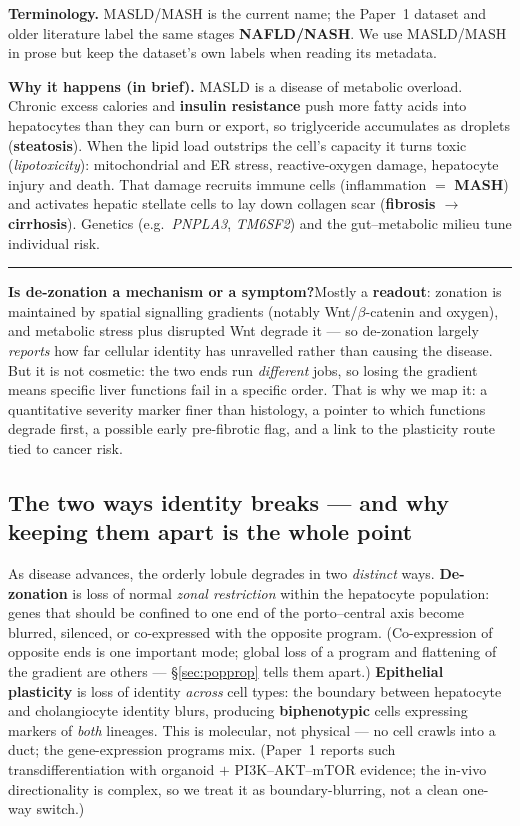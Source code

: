 \documentclass[11pt]{article}
\newcommand{\aside}[2]{\par\medskip\noindent\textcolor{teal0}{\rule{2pt}{\baselineskip}}\quad\textbf{\textcolor{teal0}{#1}}\quad #2\par\medskip}
\newcommand{\gene}[1]{\textit{#1}}
\begin{document}
\textbf{Terminology.} MASLD/MASH is the current name; the Paper~1 dataset and older literature label
the same stages \textbf{NAFLD/NASH}. We use MASLD/MASH in prose but keep the dataset's own labels when
reading its metadata.

\textbf{Why it happens (in brief).} MASLD is a disease of metabolic overload. Chronic excess calories
and \textbf{insulin resistance} push more fatty acids into hepatocytes than they can burn or export,
so triglyceride accumulates as droplets (\textbf{steatosis}). When the lipid load outstrips the cell's
capacity it turns toxic (\emph{lipotoxicity}): mitochondrial and ER stress, reactive-oxygen damage,
hepatocyte injury and death. That damage recruits immune cells (inflammation $=$ \textbf{MASH}) and
activates hepatic stellate cells to lay down collagen scar (\textbf{fibrosis $\to$ cirrhosis}).
Genetics (e.g.\ \gene{PNPLA3}, \gene{TM6SF2}) and the gut--metabolic milieu tune individual risk.

\aside{Is de-zonation a mechanism or a symptom?}{Mostly a \textbf{readout}: zonation is maintained by
spatial signalling gradients (notably Wnt/$\beta$-catenin and oxygen), and metabolic stress plus
disrupted Wnt degrade it --- so de-zonation largely \emph{reports} how far cellular identity has
unravelled rather than causing the disease. But it is not cosmetic: the two ends run \emph{different}
jobs, so losing the gradient means specific liver functions fail in a specific order. That is why we
map it: a quantitative severity marker finer than histology, a pointer to which functions degrade
first, a possible early pre-fibrotic flag, and a link to the plasticity route tied to cancer risk.}

\subsection{The two ways identity breaks --- and why keeping them apart is the whole point}
\label{sec:twobreaks}

As disease advances, the orderly lobule degrades in two \emph{distinct} ways. \textbf{De-zonation} is
loss of normal \emph{zonal restriction} within the hepatocyte population: genes that should be confined
to one end of the porto--central axis become blurred, silenced, or co-expressed with the opposite
program. (Co-expression of opposite ends is one important mode; global loss of a program and flattening
of the gradient are others --- \S\ref{sec:popprop} tells them apart.) \textbf{Epithelial plasticity}
is loss of identity \emph{across} cell types: the boundary between hepatocyte and cholangiocyte
identity blurs, producing \textbf{biphenotypic} cells expressing markers of \emph{both} lineages. This
is molecular, not physical --- no cell crawls into a duct; the gene-expression programs mix. (Paper~1
reports such transdifferentiation with organoid $+$ PI3K--AKT--mTOR evidence; the in-vivo
directionality is complex, so we treat it as boundary-blurring, not a clean one-way switch.)
\end{document}

